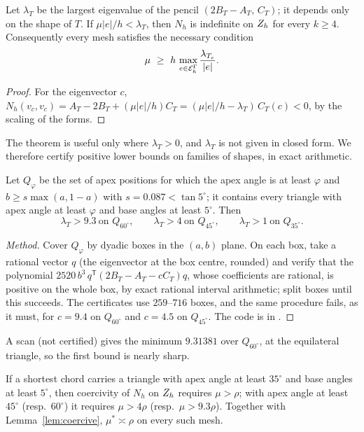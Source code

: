 \begin{theorem}\label{thm:pb1}
Let $\lambda_T$ be the largest eigenvalue of the pencil $(2B_T-A_T,\,C_T)$; it depends only on the shape of $T$. If $\mu|e|/h<\lambda_T$, then $N_h$ is indefinite on $Z_h$ for every $k\ge4$. Consequently every mesh satisfies the necessary condition
\[
\mu\ \ge\ h\,\max_{e\in\EG}\frac{\lambda_{T_e}}{|e|} .
\]
\end{theorem}

\begin{proof}
For the eigenvector $c$, $N_h(v_c,v_c)=A_T-2B_T+(\mu|e|/h)C_T=(\mu|e|/h-\lambda_T)\,C_T(c)<0$, by the scaling of the forms.
\end{proof}

The theorem is useful only where $\lambda_T>0$, and $\lambda_T$ is not given in closed form. We therefore certify positive lower bounds on families of shapes, in exact arithmetic.

\begin{proposition}\label{prop:cert}
Let $Q_\varphi$ be the set of apex positions for which the apex angle is at least $\varphi$ and $b\ge s\max(a,1-a)$ with $s=0.087<\tan5^\circ$; it contains every triangle with apex angle at least $\varphi$ and base angles at least $5^\circ$. Then
\[
\lambda_T>9.3\ \text{on }Q_{60^\circ},\qquad \lambda_T>4\ \text{on }Q_{45^\circ},\qquad \lambda_T>1\ \text{on }Q_{35^\circ}.
\]
\end{proposition}

\begin{proof}[Method]
Cover $Q_\varphi$ by dyadic boxes in the $(a,b)$ plane. On each box, take a rational vector $q$ (the eigenvector at the box centre, rounded) and verify that the polynomial $2520\,b^3\,q^{\mathsf T}(2B_T-A_T-cC_T)q$, whose coefficients are rational, is positive on the whole box, by exact rational interval arithmetic; split boxes until this succeeds. The certificates use $259$--$716$ boxes, and the same procedure fails, as it must, for $c=9.4$ on $Q_{60^\circ}$ and $c=4.5$ on $Q_{45^\circ}$. The code is in \cite{ZeroGradRepo}.
\end{proof}

A scan (not certified) gives the minimum $9.31381$ over $Q_{60^\circ}$, at the equilateral triangle, so the first bound is nearly sharp.

\begin{corollary}\label{cor:rho}
If a shortest chord carries a triangle with apex angle at least $35^\circ$ and base angles at least $5^\circ$, then coercivity of $N_h$ on $Z_h$ requires $\mu>\rho$; with apex angle at least $45^\circ$ (resp.\ $60^\circ$) it requires $\mu>4\rho$ (resp.\ $\mu>9.3\rho$). Together with Lemma~\ref{lem:coercive}, $\mu^\ast\asymp\rho$ on every such mesh.
\end{corollary}

